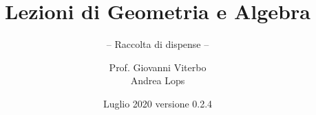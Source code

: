 \documentclass[envcountsame,envcountchap]{svmono}
\begin{document}
\author{Prof. Giovanni Viterbo \\ Andrea Lops}
\title{Lezioni di Geometria e Algebra}
\subtitle{-- Raccolta di dispense --}
\date{Luglio 2020 versione 0.2.4}
\maketitle

\frontmatter%




\tableofcontents


\mainmatter%


%
%

\backmatter%


\printindex

\end{document}
